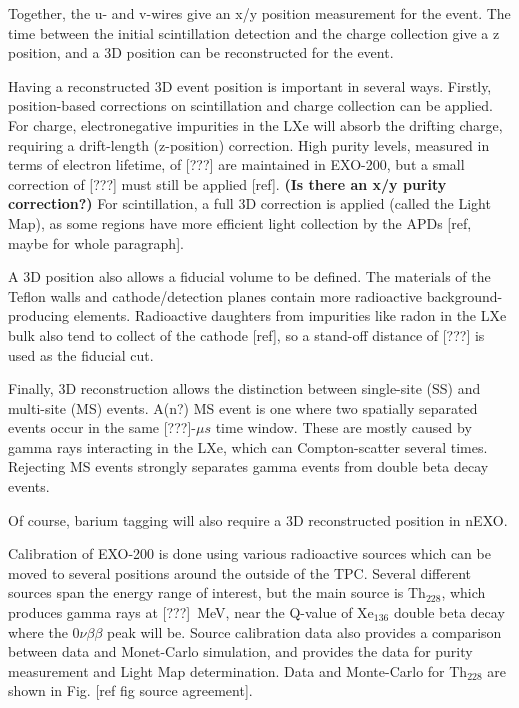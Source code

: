 Together, the u- and v-wires give an x/y position measurement for the event.  The time between the initial scintillation detection and the charge collection give a z position, and a 3D position can be reconstructed for the event.  

Having a reconstructed 3D event position is important in several ways.  Firstly, position-based corrections on scintillation and charge collection can be applied.  For charge, electronegative impurities in the LXe will absorb the drifting charge, requiring a drift-length (z-position) correction.  High purity levels, measured in terms of electron lifetime, of [???] are maintained in EXO-200, but a small correction of [???] must still be applied [ref].  {\color{red}\textbf{(Is there an x/y purity correction?)}}  For scintillation, a full 3D correction is applied (called the Light Map), as some regions have more efficient light collection by the APDs [ref, maybe for whole paragraph].

A 3D position also allows a fiducial volume to be defined.  The materials of the Teflon walls and cathode/detection planes contain more radioactive background-producing elements.  Radioactive daughters from impurities like radon in the LXe bulk also tend to collect of the cathode [ref], so a stand-off distance of [???] is used as the fiducial cut.

Finally, 3D reconstruction allows the distinction between single-site (SS) and multi-site (MS) events.  A(n?) MS event is one where two spatially separated events occur in the same [???]-$\mu s$ time window.  These are mostly caused by gamma rays interacting in the LXe, which can Compton-scatter several times.  Rejecting MS events strongly separates gamma events from double beta decay events.

Of course, barium tagging will also require a 3D reconstructed position in nEXO.

Calibration of EXO-200 is done using various radioactive sources which can be moved to several positions around the outside of the TPC.  Several different sources span the energy range of interest, but the main source is {\color{red}Th$_{228}$}, which produces gamma rays at [???]~MeV, near the Q-value of Xe$_{136}$ double beta decay where the $0\nu\beta\beta$ peak will be.  Source calibration data also provides a comparison between data and Monet-Carlo simulation, and provides the data for purity measurement and Light Map determination.  Data and Monte-Carlo for Th$_{228}$ are shown in Fig. [ref fig source agreement].

